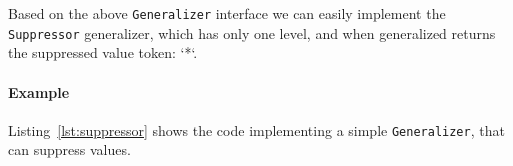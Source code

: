 Based on the above \texttt{Generalizer} interface we can easily implement the \texttt{Suppressor} generalizer, which has only one level, and when generalized returns the suppressed value token: `*`.

\paragraph{Example} Listing~\ref{lst:suppressor} shows the code implementing a simple \texttt{Generalizer}, that can suppress values.

